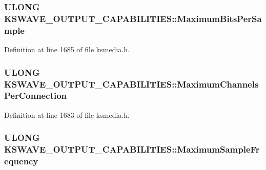 \subsubsection[{\texorpdfstring{Maximum\+Bits\+Per\+Sample}{MaximumBitsPerSample}}]{\setlength{\rightskip}{0pt plus 5cm}U\+L\+O\+NG K\+S\+W\+A\+V\+E\+\_\+\+O\+U\+T\+P\+U\+T\+\_\+\+C\+A\+P\+A\+B\+I\+L\+I\+T\+I\+E\+S\+::\+Maximum\+Bits\+Per\+Sample}\hypertarget{struct_k_s_w_a_v_e___o_u_t_p_u_t___c_a_p_a_b_i_l_i_t_i_e_s_a83e7f7eb5a46186f72c57f70a7585da2}{}\label{struct_k_s_w_a_v_e___o_u_t_p_u_t___c_a_p_a_b_i_l_i_t_i_e_s_a83e7f7eb5a46186f72c57f70a7585da2}


Definition at line 1685 of file ksmedia.\+h.

\subsubsection[{\texorpdfstring{Maximum\+Channels\+Per\+Connection}{MaximumChannelsPerConnection}}]{\setlength{\rightskip}{0pt plus 5cm}U\+L\+O\+NG K\+S\+W\+A\+V\+E\+\_\+\+O\+U\+T\+P\+U\+T\+\_\+\+C\+A\+P\+A\+B\+I\+L\+I\+T\+I\+E\+S\+::\+Maximum\+Channels\+Per\+Connection}\hypertarget{struct_k_s_w_a_v_e___o_u_t_p_u_t___c_a_p_a_b_i_l_i_t_i_e_s_a298a519ac95e4e51fab52fa331affdc9}{}\label{struct_k_s_w_a_v_e___o_u_t_p_u_t___c_a_p_a_b_i_l_i_t_i_e_s_a298a519ac95e4e51fab52fa331affdc9}


Definition at line 1683 of file ksmedia.\+h.

\subsubsection[{\texorpdfstring{Maximum\+Sample\+Frequency}{MaximumSampleFrequency}}]{\setlength{\rightskip}{0pt plus 5cm}U\+L\+O\+NG K\+S\+W\+A\+V\+E\+\_\+\+O\+U\+T\+P\+U\+T\+\_\+\+C\+A\+P\+A\+B\+I\+L\+I\+T\+I\+E\+S\+::\+Maximum\+Sample\+Frequency}\hypertarget{struct_k_s_w_a_v_e___o_u_t_p_u_t___c_a_p_a_b_i_l_i_t_i_e_s_a2ecc830540bed57379228dc2528fbf5b}{}\label{struct_k_s_w_a_v_e___o_u_t_p_u_t___c_a_p_a_b_i_l_i_t_i_e_s_a2ecc830540bed57379228dc2528fbf5b}


